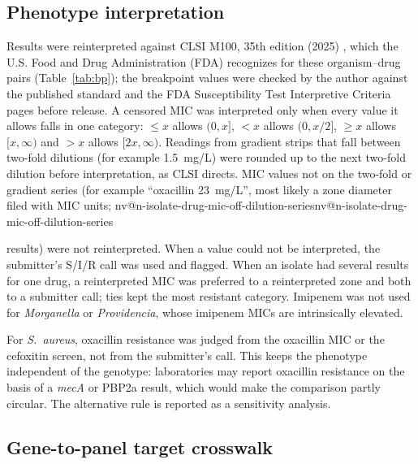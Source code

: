\documentclass[10pt,twocolumn,letterpaper]{article}
\makeatletter
\newcommand{\nv}[1]{\ifcsname nv@#1\endcsname\csname nv@#1\endcsname\else
  \PackageError{numbers}{Unknown number key: #1}{Run build_assets.py}\fi}
\newcommand{\g}[1]{\textit{#1}}  %
\newcommand{\sau}{\textit{S.~aureus}}
\makeatother
\begin{document}
\subsection{Phenotype interpretation}

Results were reinterpreted against CLSI M100, 35th edition (2025) \cite{clsi2025}, which the U.S. Food and Drug
Administration (FDA) recognizes for these organism--drug pairs \cite{fdastic} (Table~\ref{tab:bp}); the breakpoint values
were checked by the author against the published standard and the FDA Susceptibility Test Interpretive Criteria pages
before release. A censored MIC was interpreted only when every value it allows falls in one category: $\le x$ allows
$(0,x]$, $<x$ allows $(0,x/2]$, $\ge x$ allows $[x,\infty)$ and $>x$ allows $[2x,\infty)$. Readings from gradient strips
that fall between two-fold dilutions (for example 1.5~mg/L) were rounded up to the next two-fold dilution before
interpretation, as CLSI directs. MIC values not on the two-fold or gradient series (for example ``oxacillin 23~mg/L'', most
likely a zone diameter filed with MIC units; \nv{n-isolate-drug-mic-off-dilution-series} results) were not
reinterpreted. When a value could not be interpreted, the submitter's S/I/R call was used and flagged. When an isolate had
several results for one drug, a reinterpreted MIC was preferred to a reinterpreted zone and both to a submitter call; ties
kept the most resistant category. Imipenem was not used for \textit{Morganella} or \textit{Providencia}, whose imipenem
MICs are intrinsically elevated.

For \sau{}, oxacillin resistance was judged from the oxacillin MIC or the cefoxitin screen, not from the submitter's
call. This keeps the phenotype independent of the genotype: laboratories may report oxacillin resistance on the basis of a
\g{mecA} or PBP2a result, which would make the comparison partly circular. The alternative rule is reported as a
sensitivity analysis.

\begin{table}[t]
\caption{Breakpoints applied (CLSI M100, 35th ed., 2025). ``Between'' gives the category assigned between the S and R
breakpoints; ``--'' means none is defined.}
\label{tab:bp}
\centering\footnotesize
\resizebox{\linewidth}{!}{}
\end{table}

\subsection{Gene-to-panel target crosswalk}
\end{document}
